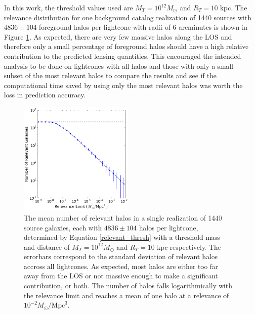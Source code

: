 \documentclass[%
 reprint,
 amsmath,amssymb,
 aps,nofootinbib
]{revtex4-1}
\begin{document}
In this work, the threshold values used are ${M_T=10^{12}M_\odot}$ and ${R_T=10}$ kpc. The relevance distribution for one background catalog realization of 1440 sources with ${4836\pm104}$ foreground halos per lightcone with radii of 6 arcminutes is shown in Figure \ref{fig:rel_dist}. As expected, there are very few massive halos along the LOS and therefore only a small percentage of foreground halos should have a high relative contribution to the predicted lensing quantities. This encouraged the intended analysis to be done on lightcones with all halos and those with only a small subset of the most relevant halos to compare the results and see if the computational time saved by using only the most relevant halos was worth the loss in prediction accuracy.

\begin{figure}
    \centering
    \includegraphics[width=0.5\textwidth]{figs-swe/thesis/relevance_distribution.png}
    \captionsetup{justification=raggedright,singlelinecheck=false}
    \caption{The mean number of relevant halos in a single realization of 1440 source galaxies, each with ${4836\pm104}$ halos per lightcone, determined by Equation \eqref{relevant_thresh} with a threshold mass and distance of ${M_T=10^{12}M_\odot}$ and ${R_T=10}$ kpc respectively. The errorbars correspond to the standard deviation of relevant halos accross all lightcones. As expected, most halos are either too far away from the LOS or not massive enough to make a significant contribution, or both. The number of halos falls logarithmically with the relevance limit and reaches a mean of one halo at a relevance of ${10^{-2}M_\odot/\text{Mpc}^3}$.}
    \label{fig:rel_dist}
\end{figure}
\end{document}
